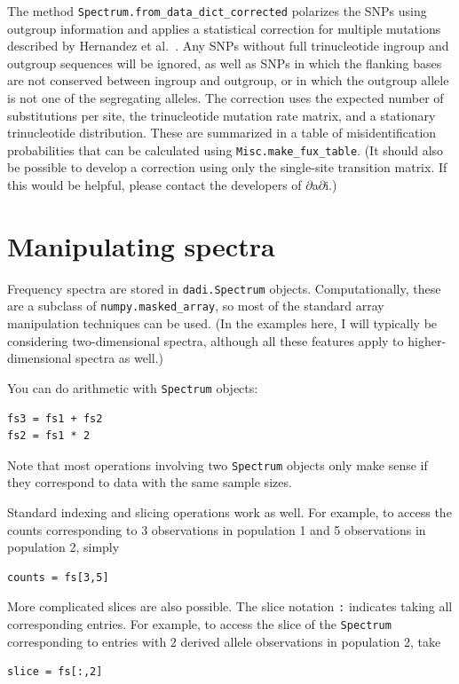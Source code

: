 \documentclass[12pt]{article}
\makeatletter
\newcommand{\dadi}{$\partial$a$\partial$i\xspace}
\newcommand{\py}[1]{\lstinline[language=Python, showstringspaces=False]@#1@}
\makeatother
\begin{document}
The method \py{Spectrum.from_data_dict_corrected} polarizes the SNPs using outgroup information and applies a statistical correction for multiple mutations described by Hernandez et al.~\cite{bib:Hernandez2007}.
Any SNPs without full trinucleotide ingroup and outgroup sequences will be ignored, as well as SNPs in which the flanking bases are not conserved between ingroup and outgroup, or in which the outgroup allele is not one of the segregating alleles.
The correction uses the expected number of substitutions per site, the trinucleotide mutation rate matrix, and a stationary trinucleotide distribution.
These are summarized in a table of misidentification probabilities that can be calculated using \py{Misc.make_fux_table}.
(It should also be possible to develop a correction using only the single-site transition matrix.
If this would be helpful, please contact the developers of \dadi.)

\section{Manipulating spectra}\label{sec:manip}

Frequency spectra are stored in \py{dadi.Spectrum} objects.
Computationally, these are a subclass of \py{numpy.masked_array}, so most of the standard array manipulation techniques can be used.
(In the examples here, I will typically be considering two-dimensional spectra, although all these features apply to higher-dimensional spectra as well.)

You can do arithmetic with \py{Spectrum} objects:
\begin{lstlisting}
fs3 = fs1 + fs2
fs2 = fs1 * 2
\end{lstlisting}
Note that most operations involving two \py{Spectrum} objects only make sense if they correspond to data with the same sample sizes.

Standard indexing and slicing operations work as well.
For example, to access the counts corresponding to 3 observations in population 1 and 5 observations in population 2, simply
\begin{lstlisting}
counts = fs[3,5]
\end{lstlisting}
More complicated slices are also possible.
The slice notation \py{:} indicates taking all corresponding entries.
For example, to access the slice of the \py{Spectrum} corresponding to entries with 2 derived allele observations in population 2, take
\begin{lstlisting}
slice = fs[:,2]
\end{lstlisting}
\end{document}
